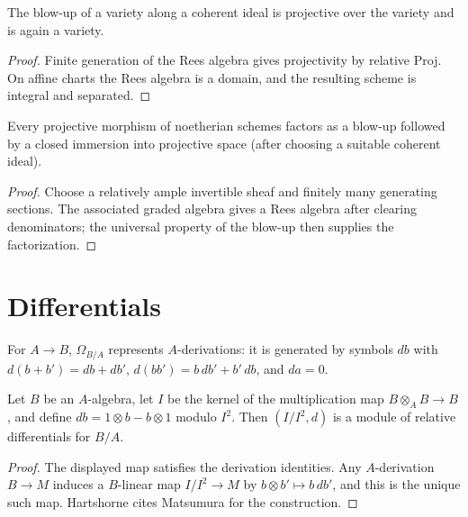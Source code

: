 \begin{proposition}
\label{prop:II-7-16}
The blow-up of a variety along a coherent ideal is projective over the variety and is again a variety.
\end{proposition}
\begin{proof}
Finite generation of the Rees algebra gives projectivity by relative Proj. On affine charts the Rees
algebra is a domain, and the resulting scheme is integral and separated.
\end{proof}

\begin{theorem}
\label{thm:II-7-17}
Every projective morphism of noetherian schemes factors as a blow-up followed by a closed immersion
into projective space (after choosing a suitable coherent ideal).
\end{theorem}
\begin{proof}
Choose a relatively ample invertible sheaf and finitely many generating sections. The associated
graded algebra gives a Rees algebra after clearing denominators; the universal property of the blow-up
then supplies the factorization.
\end{proof}

\section{Differentials}

\begin{definition}
\label{def:II-8-differentials}
For $A\to B$, $\Omega_{B/A}$ represents $A$-derivations: it is generated by symbols $db$ with
$d(b+b')=db+db'$, $d(bb')=b\,db'+b'\,db$, and $da=0$.
\end{definition}

\begin{proposition}
\label{prop:II-8-1A}
Let $B$ be an $A$-algebra, let $I$ be the kernel of the multiplication map
$B\otimes_A B\to B$, and define $db=1\otimes b-b\otimes1$ modulo $I^2$.  Then
$(I/I^2,d)$ is a module of relative differentials for $B/A$.
\end{proposition}
\begin{proof}
The displayed map satisfies the derivation identities.  Any $A$-derivation $B\to M$ induces a
$B$-linear map $I/I^2\to M$ by $b\otimes b'\mapsto b\,db'$, and this is the unique such map.
Hartshorne cites Matsumura for the construction.
\end{proof}

